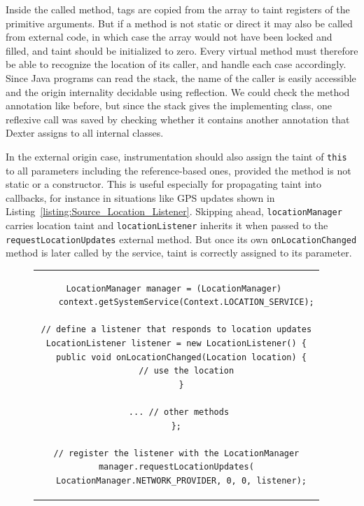 \documentclass[12pt,twoside,notitlepage]{report}
\begin{document}
Inside the called method, tags are copied from the array to taint registers of the primitive arguments. But if a method is not static or direct it may also be called from external code, in which case the array would not have been locked and filled, and taint should be initialized to zero. Every virtual method must therefore be able to recognize the location of its caller, and handle each case accordingly. Since Java programs can read the stack, the name of the caller is easily accessible and the origin internality decidable using reflection. We could check the method annotation like before, but since the stack gives the implementing class, one reflexive call was saved by checking whether it contains another annotation that Dexter assigns to all internal classes.

In the external origin case, instrumentation should also assign the taint of \verb$this$ to all parameters including the reference-based ones, provided the method is not static or a constructor. This is useful especially for propagating taint into callbacks, for instance in situations like GPS updates shown in Listing~\ref{listing:Source_Location_Listener}. Skipping ahead, \verb$locationManager$ carries location taint and \verb$locationListener$ inherits it when passed to the \verb$requestLocationUpdates$ external method. But once its own \verb$onLocationChanged$ method is later called by the service, taint is correctly assigned to its parameter.

\begin{figure}
	\centering
	\begin{tabular}{c}
	\begin{lstlisting}
LocationManager manager = (LocationManager) 
	context.getSystemService(Context.LOCATION_SERVICE);

// define a listener that responds to location updates
LocationListener listener = new LocationListener() {
  public void onLocationChanged(Location location) {
    // use the location
  }

  ... // other methods 
};

// register the listener with the LocationManager
manager.requestLocationUpdates(
  LocationManager.NETWORK_PROVIDER, 0, 0, listener);
	\end{lstlisting}
	\end{tabular}
	\begin{lstlisting}[caption={Example of a location-updating callback class},
	                   label={listing:Source_Location_Listener}]
	\end{lstlisting}
\end{figure}
\end{document}
